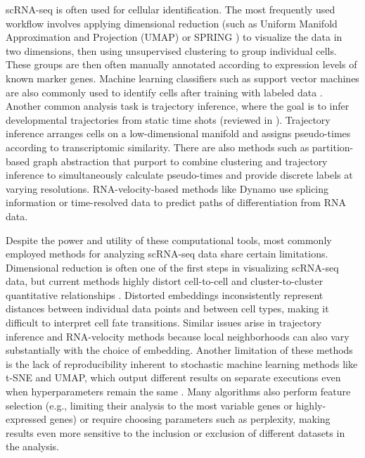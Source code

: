 \documentclass[aps,superscriptaddress, notitlepage,longbibliography]{revtex4-1}
\begin{document}
scRNA-seq is often used for cellular identification. The most frequently used workflow involves applying dimensional reduction (such as Uniform Manifold Approximation and Projection (UMAP) \cite{mcinnes_umap_2018} or SPRING \cite{weinreb_spring_2018}) to visualize the data in two dimensions, then using unsupervised clustering to group individual cells. These groups are then often manually annotated according to expression levels of known marker genes. Machine learning classifiers such as support vector machines are also commonly used to identify cells after training with labeled data \cite{abdelaal_comparison_2019}. Another common analysis task is trajectory inference, where the goal is to infer developmental trajectories from static time shots (reviewed in \cite{saelens2019comparison,wagner2020lineage}). Trajectory inference arranges cells on a low-dimensional manifold and assigns pseudo-times according to transcriptomic similarity. There are also methods such as partition-based graph abstraction \cite{wolf_paga_2019} that purport to combine clustering and trajectory inference to simultaneously calculate pseudo-times and provide discrete labels at varying resolutions. RNA-velocity-based methods like Dynamo \cite{qiu2022mapping} use splicing information or time-resolved data to predict paths of differentiation from RNA data.

Despite the power and utility of these computational tools, most commonly employed methods for analyzing scRNA-seq data share certain limitations. Dimensional reduction is often one of the first steps in visualizing scRNA-seq data, but current methods highly distort cell-to-cell and cluster-to-cluster quantitative relationships \cite{chari_specious_2021}. Distorted embeddings inconsistently represent distances between individual data points and between cell types, making it difficult to interpret cell fate transitions. Similar issues arise in trajectory inference and RNA-velocity methods because local neighborhoods can also vary substantially with the choice of embedding. Another limitation of these methods is the lack of reproducibility inherent to stochastic machine learning methods like t-SNE and UMAP, which output different results on separate executions even when hyperparameters remain the same \cite{wattenberg_how_2016}. Many algorithms also perform feature selection (e.g., limiting their analysis to the most variable genes or highly-expressed genes) or require choosing parameters such as perplexity, making results even more sensitive to the inclusion or exclusion of different datasets in the analysis. 
\end{document}
